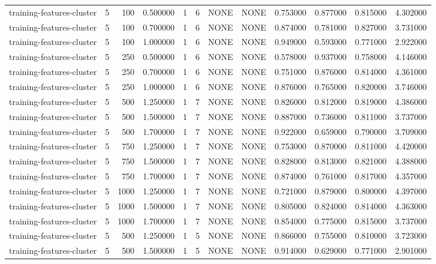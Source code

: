 \begin{tabular}{lrrrllllrrrr}
training-features-cluster & 5 & 100 & 0.500000 & 1 & 6 & NONE & NONE & 0.753000 & 0.877000 & 0.815000 & 4.302000 \\
training-features-cluster & 5 & 100 & 0.700000 & 1 & 6 & NONE & NONE & 0.874000 & 0.781000 & 0.827000 & 3.731000 \\
training-features-cluster & 5 & 100 & 1.000000 & 1 & 6 & NONE & NONE & 0.949000 & 0.593000 & 0.771000 & 2.922000 \\
training-features-cluster & 5 & 250 & 0.500000 & 1 & 6 & NONE & NONE & 0.578000 & 0.937000 & 0.758000 & 4.146000 \\
training-features-cluster & 5 & 250 & 0.700000 & 1 & 6 & NONE & NONE & 0.751000 & 0.876000 & 0.814000 & 4.361000 \\
training-features-cluster & 5 & 250 & 1.000000 & 1 & 6 & NONE & NONE & 0.876000 & 0.765000 & 0.820000 & 3.746000 \\
training-features-cluster & 5 & 500 & 1.250000 & 1 & 7 & NONE & NONE & 0.826000 & 0.812000 & 0.819000 & 4.386000 \\
training-features-cluster & 5 & 500 & 1.500000 & 1 & 7 & NONE & NONE & 0.887000 & 0.736000 & 0.811000 & 3.737000 \\
training-features-cluster & 5 & 500 & 1.700000 & 1 & 7 & NONE & NONE & 0.922000 & 0.659000 & 0.790000 & 3.709000 \\
training-features-cluster & 5 & 750 & 1.250000 & 1 & 7 & NONE & NONE & 0.753000 & 0.870000 & 0.811000 & 4.420000 \\
training-features-cluster & 5 & 750 & 1.500000 & 1 & 7 & NONE & NONE & 0.828000 & 0.813000 & 0.821000 & 4.388000 \\
training-features-cluster & 5 & 750 & 1.700000 & 1 & 7 & NONE & NONE & 0.874000 & 0.761000 & 0.817000 & 4.357000 \\
training-features-cluster & 5 & 1000 & 1.250000 & 1 & 7 & NONE & NONE & 0.721000 & 0.879000 & 0.800000 & 4.397000 \\
training-features-cluster & 5 & 1000 & 1.500000 & 1 & 7 & NONE & NONE & 0.805000 & 0.824000 & 0.814000 & 4.363000 \\
training-features-cluster & 5 & 1000 & 1.700000 & 1 & 7 & NONE & NONE & 0.854000 & 0.775000 & 0.815000 & 3.737000 \\
training-features-cluster & 5 & 500 & 1.250000 & 1 & 5 & NONE & NONE & 0.866000 & 0.755000 & 0.810000 & 3.723000 \\
training-features-cluster & 5 & 500 & 1.500000 & 1 & 5 & NONE & NONE & 0.914000 & 0.629000 & 0.771000 & 2.901000 \\

\end{tabular}
